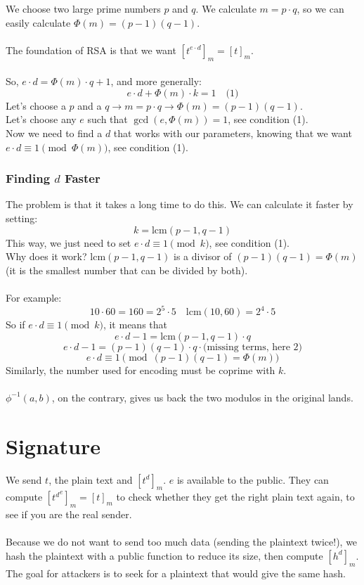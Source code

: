 \documentclass{article}
\begin{document}
We choose two large prime numbers \( p \) and \( q \).
We calculate \( m = p \cdot q \), so we can easily calculate \(\Phi(m) = (p-1)(q-1)\).\\\\
The foundation of RSA is that we want \([t^{e \cdot d}]_m = [t]_m\).\\\\
So, \( e \cdot d = \Phi(m) \cdot q + 1 \), and more generally:
\[
e \cdot d + \Phi(m) \cdot k = 1 \quad \text{(1)}
\]
Let's choose a \( p \) and a \( q \rightarrow m = p \cdot q \rightarrow \Phi(m) = (p-1)(q-1)\).\\
Let's choose any \( e \) such that \( \gcd(e, \Phi(m)) = 1 \), see condition (1).\\
Now we need to find a \( d \) that works with our parameters, knowing that we want \( e \cdot d \equiv 1 \pmod{\Phi(m)} \), see condition (1).

\subsubsection{Finding \( d \) Faster}

The problem is that it takes a long time to do this. We can calculate it faster by setting:
\[
k = \mathrm{lcm}(p - 1, q - 1)
\]
This way, we just need to set \( e \cdot d \equiv 1 \pmod{k} \), see condition (1).\\
Why does it work? \(\mathrm{lcm}(p - 1, q-1)\) is a divisor of \((p-1)(q-1) = \Phi(m)\) (it is the smallest number that can be divided by both).\\\\
For example:
\[
10 \cdot 60 = 160 = 2^5 \cdot 5 \quad \mathrm{lcm}(10, 60) = 2^4 \cdot 5
\]
So if \( e \cdot d \equiv 1 \pmod{k} \), it means that 
\[
e \cdot d - 1 = \mathrm{lcm}(p-1, q-1) \cdot q
\]
\[
e \cdot d - 1 = (p-1)(q-1) \cdot q \cdot \text{(missing terms, here 2)}
\]
\[
e \cdot d \equiv 1 \pmod{(p-1)(q-1) = \Phi(m)}
\]
Similarly, the number used for encoding must be coprime with \( k \).\\\\
\(\phi^{-1}(a, b)\), on the contrary, gives us back the two modulos in the original lands.

\newpage

\section{Signature}

We send $t$, the plain text and $[t^d]_m$. $e$ is available to the public. They can compute $[{t^d}^e]_m = [t]_m$ to check whether they get the right plain text again, to see if you are the real sender.\\\\
Because we do not want to send too much data (sending the plaintext twice!), we hash the plaintext with a public function to reduce its size, then compute $[h^d]_m$. The goal for attackers is to seek for a plaintext that would give the same hash.
\end{document}
